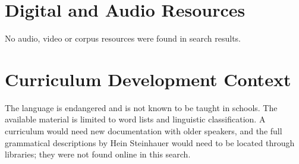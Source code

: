 \documentclass[12pt]{article}
\begin{document}
\section{Digital and Audio Resources}
No audio, video or corpus resources were found in search results.

\section{Curriculum Development Context}
The language is endangered and is not known to be taught in schools. The available material is limited to word lists and linguistic classification. A curriculum would need new documentation with older speakers, and the full grammatical descriptions by Hein Steinhauer would need to be located through libraries; they were not found online in this search.
\end{document}
